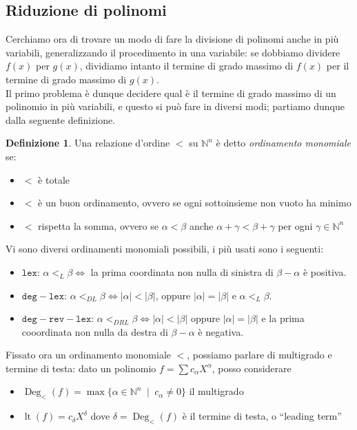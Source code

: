 \documentclass[a4paper,10pt]{article}
\theoremstyle{plain}
\theoremstyle{definition}
\newtheorem{defn}{Definizione}[section]
\DeclareMathOperator{\lt}{lt}
\DeclareMathOperator{\Deg}{Deg}
\DeclareMathOperator{\st}{\; |\;}
\newcommand{\N}{\mathbb{N}}
\begin{document}
\subsection{Riduzione di polinomi}
Cerchiamo ora di trovare un modo di fare la divisione di polinomi anche in più variabili, generalizzando il procedimento in una variabile: se dobbiamo dividere $f(x)$ per $g(x)$, dividiamo intanto il termine di grado massimo di $f(x)$ per il termine di grado massimo di $g(x)$.\\
Il primo problema è dunque decidere qual è il termine di grado massimo di un polinomio in più variabili, e questo si può fare in diversi modi; partiamo dunque dalla seguente definizione.\\
\begin{defn}
    Una relazione d'ordine $<$ su $\N^n$ è detto \emph{ordinamento monomiale} se:
    \begin{itemize}
        \item $<$ è totale
        \item $<$ è un buon ordinamento, ovvero se ogni sottoinsieme non vuoto ha minimo
        \item $<$ rispetta la somma, ovvero se $\alpha<\beta$ anche $\alpha+\gamma<\beta+\gamma$ per ogni $\gamma\in\N^n$
    \end{itemize}
\end{defn}

Vi sono diversi ordinamenti monomiali possibili, i più usati sono i seguenti:
\begin{itemize}
    \item $\mathtt{lex}$: $\alpha<_{L}\beta\iff$ la prima coordinata non nulla di sinistra di $\beta-\alpha$ è positiva.
    \item $\mathtt{deg-lex}$: $\alpha<_{DL}\beta\iff|\alpha|<|\beta|$, oppure $|\alpha|=|\beta|$ e $\alpha<_L\beta$.
    \item $\mathtt{deg-rev-lex}$: $\alpha<_{DRL}\beta\iff|\alpha|<|\beta|$ oppure $|\alpha|=|\beta|$ e la prima cooordinata non nulla da destra di $\beta-\alpha$ è negativa.
\end{itemize}

Fissato ora un ordinamento monomiale $<$, possiamo parlare di multigrado e termine di testa: dato un polinomio $f=\sum c_\alpha X^\alpha$, posso considerare
\begin{itemize}
    \item $\Deg_{<}(f)=\max\{ \alpha\in\N^n\st c_\alpha\neq0 \}$ il multigrado
    \item $\lt(f)=c_\delta X^\delta$ dove $\delta=\Deg_{<}(f)$ è il termine di testa, o ``leading term''
\end{itemize}
\end{document}
